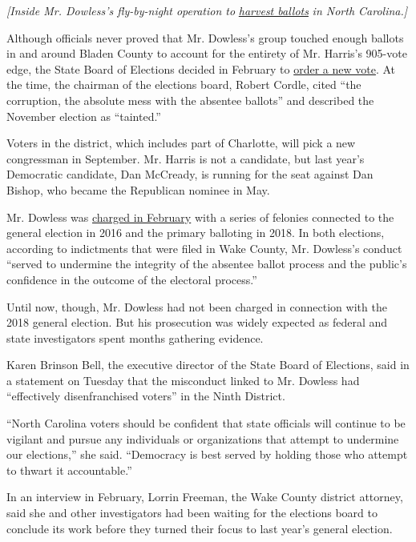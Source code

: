 \emph{{[}Inside Mr. Dowless's fly-by-night operation to}
\href{https://www.nytimes3xbfgragh.onion/2019/02/20/us/north-carolina-voter-fraud.html}{\emph{harvest
ballots}} \emph{in North Carolina.{]}}

Although officials never proved that Mr. Dowless's group touched enough
ballots in and around Bladen County to account for the entirety of Mr.
Harris's 905-vote edge, the State Board of Elections decided in February
to
\href{https://www.nytimes3xbfgragh.onion/2019/02/21/us/mark-harris-nc-voter-fraud.html}{order
a new vote}. At the time, the chairman of the elections board, Robert
Cordle, cited ``the corruption, the absolute mess with the absentee
ballots'' and described the November election as ``tainted.''

Voters in the district, which includes part of Charlotte, will pick a
new congressman in September. Mr. Harris is not a candidate, but last
year's Democratic candidate, Dan McCready, is running for the seat
against Dan Bishop, who became the Republican nominee in May.

Mr. Dowless was
\href{https://www.nytimes3xbfgragh.onion/2019/02/27/us/mcrae-dowless-indicted.html}{charged
in February} with a series of felonies connected to the general election
in 2016 and the primary balloting in 2018. In both elections, according
to indictments that were filed in Wake County, Mr. Dowless's conduct
``served to undermine the integrity of the absentee ballot process and
the public's confidence in the outcome of the electoral process.''

Until now, though, Mr. Dowless had not been charged in connection with
the 2018 general election. But his prosecution was widely expected as
federal and state investigators spent months gathering evidence.

Karen Brinson Bell, the executive director of the State Board of
Elections, said in a statement on Tuesday that the misconduct linked to
Mr. Dowless had ``effectively disenfranchised voters'' in the Ninth
District.

``North Carolina voters should be confident that state officials will
continue to be vigilant and pursue any individuals or organizations that
attempt to undermine our elections,'' she said. ``Democracy is best
served by holding those who attempt to thwart it accountable.''

In an interview in February, Lorrin Freeman, the Wake County district
attorney, said she and other investigators had been waiting for the
elections board to conclude its work before they turned their focus to
last year's general election.

